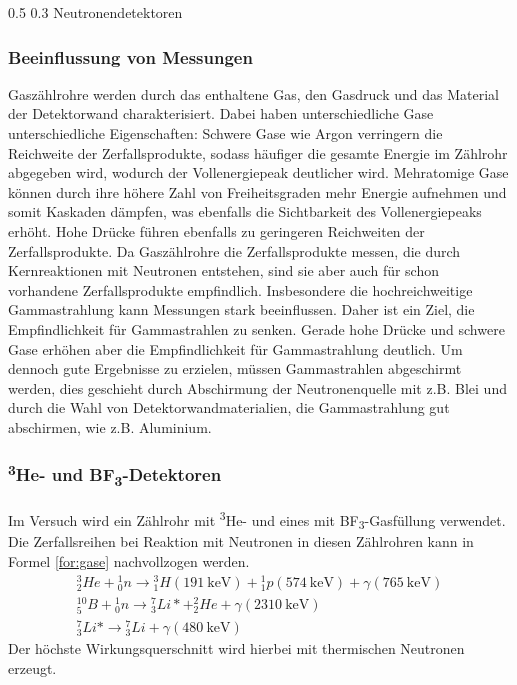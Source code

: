 \documentclass[german, %
parskip=full, %
bibliography=totoc, %
]{scrartcl}
\makeatletter
\renewcommand\subsection{\@startsection 
   {subsection}{2}{0mm}%
   {0.5\baselineskip}%
   {0.3\baselineskip}%
   {\bfseries\sffamily\large}%
   }
\makeatother
\begin{document}
\subsection{Neutronendetektoren}

\subsubsection{Beeinflussung von Messungen}

Gaszählrohre werden durch das enthaltene Gas, den Gasdruck und das Material der Detektorwand charakterisiert. Dabei haben unterschiedliche Gase unterschiedliche Eigenschaften: Schwere Gase wie Argon verringern die Reichweite der Zerfallsprodukte, sodass häufiger die gesamte Energie im Zählrohr abgegeben wird, wodurch der Vollenergiepeak deutlicher wird. Mehratomige Gase können durch ihre höhere Zahl von Freiheitsgraden mehr Energie aufnehmen und somit Kaskaden dämpfen, was ebenfalls die Sichtbarkeit des Vollenergiepeaks erhöht. Hohe Drücke führen ebenfalls zu geringeren Reichweiten der Zerfallsprodukte. Da Gaszählrohre die Zerfallsprodukte messen, die durch Kernreaktionen mit Neutronen entstehen, sind sie aber auch für schon vorhandene Zerfallsprodukte empfindlich. Insbesondere die hochreichweitige Gammastrahlung kann Messungen stark beeinflussen. Daher ist ein Ziel, die Empfindlichkeit für Gammastrahlen zu senken. Gerade hohe Drücke und schwere Gase erhöhen aber die Empfindlichkeit für Gammastrahlung deutlich. Um dennoch gute Ergebnisse zu erzielen, müssen Gammastrahlen abgeschirmt werden, dies geschieht durch Abschirmung der Neutronenquelle mit z.B. Blei und durch die Wahl von Detektorwandmaterialien, die Gammastrahlung gut abschirmen, wie z.B. Aluminium. 

\subsubsection{\textsuperscript{3}He- und BF\textsubscript{3}-Detektoren}

Im Versuch wird ein Zählrohr mit \textsuperscript{3}He- und eines mit BF\textsubscript{3}-Gasfüllung verwendet. Die Zerfallsreihen bei Reaktion mit Neutronen in diesen Zählrohren kann in Formel \ref{for:gase} nachvollzogen werden.
\begin{align}
{}^3_2He + {}^1_0n \to {}^3_1H(\SI{191}{\kilo\electronvolt}) + {}^1_1p(\SI{574}{\kilo\electronvolt}) + \gamma(\SI{765}{\kilo\electronvolt}) \\
{}^{10}_5B + {}^1_0n \to {}^7_3Li* + {}^2_2He + \gamma(\SI{2310}{\kilo\electronvolt}) \\
{}^7_3Li* \to {}^7_3Li + \gamma(\SI{480}{\kilo\electronvolt}) \label{for:gase}
\end{align}
Der höchste Wirkungsquerschnitt wird hierbei mit thermischen Neutronen erzeugt. 
\end{document}
